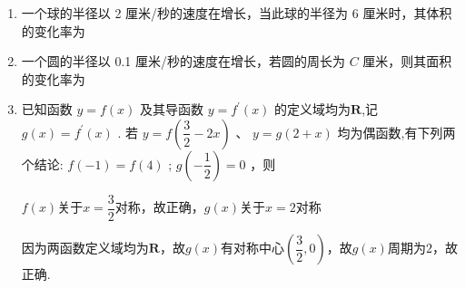 \begin{enumerate}
\begin{jieda}
        由图像重合可知$\omega = 1$，因此$f(x) = \sqrt{3}sin\left(x-\dfrac{\pi}{6}\right)$，$f'(x) = \sqrt{3}cos\left( {x - \dfrac{\pi }{6}}\right)$

        故根据诱导公式可知$\varphi = \dfrac{\pi}{2}$，因此$f(\varphi) = \dfrac{3}{2}$
    \end{jieda}
    
    \item 一个球的半径以 2 厘米/秒的速度在增长，当此球的半径为 6 厘米时，其体积的变化率为
    
    \item 一个圆的半径以 0.1 厘米/秒的速度在增长，若圆的周长为 $C$ 厘米，则其面积的变化率为
    
    \item 已知函数 $y = f\left( x\right)$ 及其导函数 $y = {f}^{\prime }\left( x\right)$ 的定义域均为$\mathbf{R}$,记 $g\left( x\right)  = {f}^{\prime }\left( x\right)$ . 若 $y = f\left( {\dfrac{3}{2} - {2x}}\right) \text{ 、 }y = g\left( {2 + x}\right)$ 均为偶函数,有下列两个结论:    $f\left( {-1}\right)  = f\left( 4\right)$ ;    $g\left( {-\dfrac{1}{2}}\right)  = 0$ ，则
    \begin{jieda}
        $f(x)$关于$x = \dfrac{3}{2}$对称，故正确，$g(x)$关于$x = 2$对称

        因为两函数定义域均为$\mathbf{R}$，故$g(x)$有对称中心$\left(\dfrac{3}{2}, 0\right)$，故$g(x)$周期为$2$，故正确.
    \end{jieda}
    

\end{enumerate}
